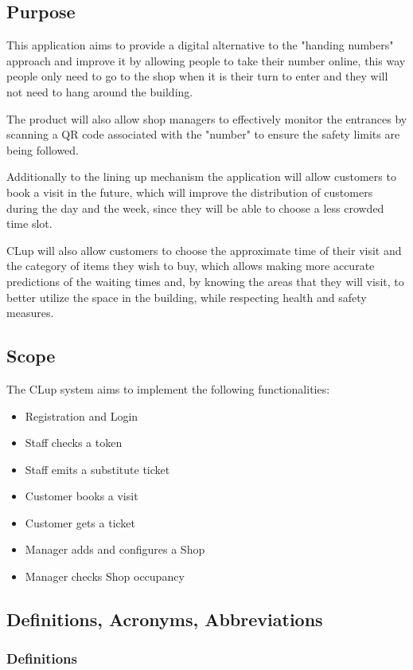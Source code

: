 \subsection{Purpose}

This application aims to provide a digital alternative to the "handing numbers" approach and improve it by allowing people to take their number online, this way people only need to go to the shop when it is their turn to enter and they will not need to hang around the building.

The product will also allow shop managers to effectively monitor the entrances by scanning a QR code associated with the "number" to ensure the safety limits are being followed.

Additionally to the lining up mechanism the application will allow customers to book a visit in the future, which will improve the distribution of customers during the day and the week, since they will be able to choose a less crowded time slot.

CLup will also allow customers to choose the approximate time of their visit and the category of items they wish to buy, which allows making more accurate predictions of the waiting times and, by knowing the areas that they will visit, to better utilize the space in the building, while respecting health and safety measures.

\subsection{Scope}

The CLup system aims to implement the following functionalities:
\begin{itemize}
    \item Registration and Login
    \item Staff checks a token
    \item Staff emits a substitute ticket
    \item Customer books a visit
    \item Customer gets a ticket
    \item Manager adds and configures a Shop
    \item Manager checks Shop occupancy
\end{itemize}

\subsection{Definitions, Acronyms, Abbreviations}
\subsubsection{Definitions}

